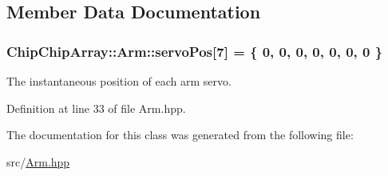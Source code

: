 \subsection{Member Data Documentation}
\hypertarget{classChipChipArray_1_1Arm_a9ddcea9544b6e2a4315b9dd705df8fdd}{
\subsubsection[{servo\+Pos}]{ Chip\+Chip\+Array\+::\+Arm\+::servo\+Pos\mbox{[}7\mbox{]} = \{ 0, 0, 0, 0, 0, 0, 0 \}}}\label{classChipChipArray_1_1Arm_a9ddcea9544b6e2a4315b9dd705df8fdd}
The instantaneous position of each arm servo. 

Definition at line 33 of file Arm.\+hpp.



The documentation for this class was generated from the following file\+:\begin{DoxyCompactItemize}
\item 
src/\hyperlink{Arm_8hpp}{Arm.\+hpp}\end{DoxyCompactItemize}
